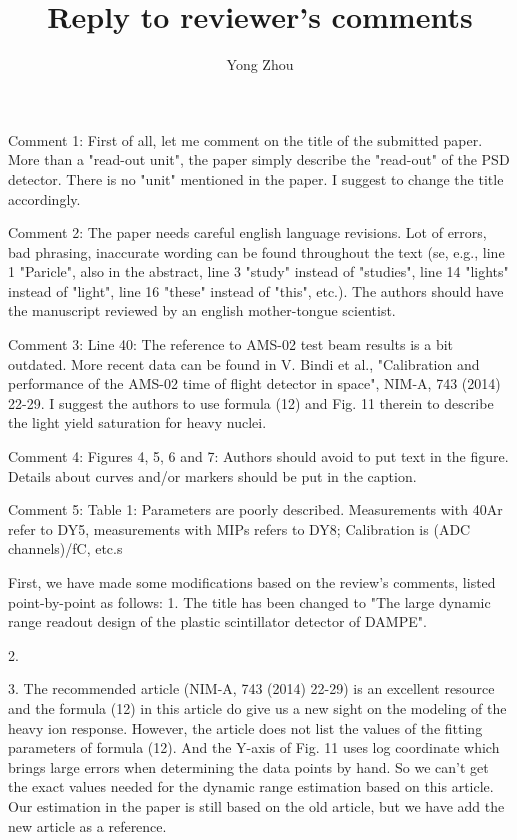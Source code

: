 \documentclass[]{article}
\title{Reply to reviewer's comments}
\author{Yong Zhou}
\begin{document}
\maketitle

\section{}
Comment 1: First of all, let me comment on the title of the submitted paper. More than a "read-out unit", the paper simply describe the "read-out" of the PSD detector. There is no "unit" mentioned in the paper. I suggest to change the title accordingly.

Comment 2: The paper needs careful english language revisions. Lot of errors, bad phrasing, inaccurate wording can be found throughout the text (se, e.g., line 1 "Paricle", also in the abstract, line 3 "study" instead of "studies", line 14 "lights" instead of "light", line 16 "these" instead of "this", etc.). The authors should have the manuscript reviewed by an english mother-tongue scientist.

Comment 3: Line 40: The reference to AMS-02 test beam results is a bit outdated. More recent data can be found in V. Bindi et al., "Calibration and performance of the AMS-02 time of flight detector in space", NIM-A, 743 (2014) 22-29. I suggest the authors to use formula (12) and Fig. 11 therein to describe the light yield saturation for heavy nuclei.

Comment 4: Figures 4, 5, 6 and 7: Authors should avoid to put text in the figure. Details about curves and/or markers should be put in the caption.

Comment 5: Table 1: Parameters are poorly described. Measurements with 40Ar refer to DY5, measurements with MIPs refers to DY8; Calibration is (ADC channels)/fC, etc.s

First, we have made some modifications based on the review's comments, listed point-by-point as follows:
1. The title has been changed to "The large dynamic range readout design of the plastic scintillator detector of DAMPE".

2. 

3. The recommended article (NIM-A, 743 (2014) 22-29) is an excellent resource and the formula (12) in this article do give us a new sight on the modeling of the heavy ion response. However, the article does not list the values of the fitting parameters of formula (12). And the Y-axis of Fig. 11 uses log coordinate which brings large errors when determining the data points by hand. So we can't get the exact values needed for the dynamic range estimation based on this article. Our estimation in the paper is still based on the old article, but we have add the new article as a reference.
\end{document}
